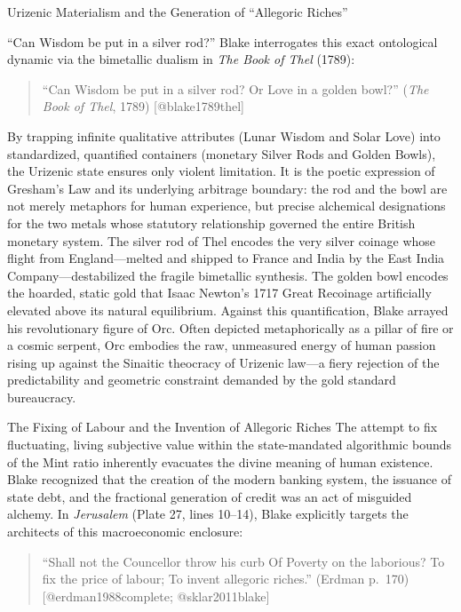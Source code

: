 \documentclass[
  ignorenonframetext,
]{beamer}
\begin{document}
\begin{frame}{Urizenic Materialism and the Generation of ``Allegoric
Riches''}
\begin{block}{``Can Wisdom be put in a silver rod?''}
\protect{}\label{can-wisdom-be-put-in-a-silver-rod}
Blake interrogates this exact ontological dynamic via the bimetallic
dualism in \emph{The Book of Thel} (1789):

\begin{quote}
``Can Wisdom be put in a silver rod? Or Love in a golden bowl?''
(\emph{The Book of Thel}, 1789) {[}@blake1789thel{]}
\end{quote}

By trapping infinite qualitative attributes (Lunar Wisdom and Solar
Love) into standardized, quantified containers (monetary Silver Rods and
Golden Bowls), the Urizenic state ensures only violent limitation. It is
the poetic expression of Gresham's Law and its underlying arbitrage
boundary: the rod and the bowl are not merely metaphors for human
experience, but precise alchemical designations for the two metals whose
statutory relationship governed the entire British monetary system. The
silver rod of Thel encodes the very silver coinage whose flight from
England---melted and shipped to France and India by the East India
Company---destabilized the fragile bimetallic synthesis. The golden bowl
encodes the hoarded, static gold that Isaac Newton's 1717 Great
Recoinage artificially elevated above its natural equilibrium. Against
this quantification, Blake arrayed his revolutionary figure of Orc.
Often depicted metaphorically as a pillar of fire or a cosmic serpent,
Orc embodies the raw, unmeasured energy of human passion rising up
against the Sinaitic theocracy of Urizenic law---a fiery rejection of
the predictability and geometric constraint demanded by the gold
standard bureaucracy.
\end{block}

\begin{block}{The Fixing of Labour and the Invention of Allegoric
Riches}
\protect{}\label{the-fixing-of-labour-and-the-invention-of-allegoric-riches}
The attempt to fix fluctuating, living subjective value within the
state-mandated algorithmic bounds of the Mint ratio inherently evacuates
the divine meaning of human existence. Blake recognized that the
creation of the modern banking system, the issuance of state debt, and
the fractional generation of credit was an act of misguided alchemy. In
\emph{Jerusalem} (Plate 27, lines 10--14), Blake explicitly targets the
architects of this macroeconomic enclosure:

\begin{quote}
``Shall not the Councellor throw his curb Of Poverty on the laborious?
To fix the price of labour; To invent allegoric riches.'' (Erdman
p.~170) {[}@erdman1988complete; @sklar2011blake{]}
\end{quote}


\end{block}
\end{frame}
\end{document}

